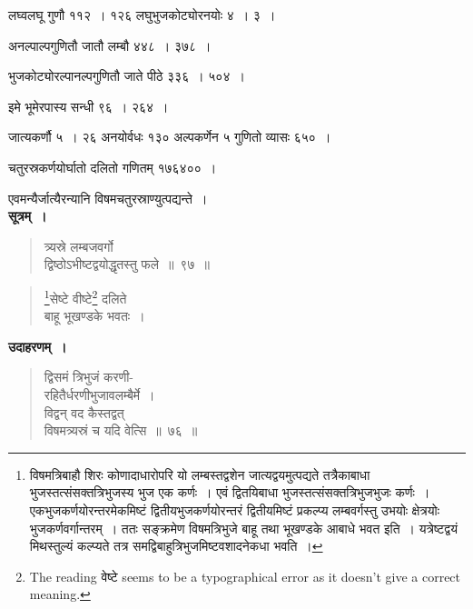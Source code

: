 \documentclass[11pt, openany]{book}
\begin{document}
लघ्वलघू गुणौ ११२~। १२६ लघुभुजकोट्योरनयोः ४~। ३~। \\
\vspace{-4mm}

अनल्पाल्पगुणितौ जातौ लम्बौ ४४८~। ३७८~। \\
\vspace{-4mm}

भुजकोट्योरल्पानल्पगुणितौ जाते पीठे ३३६~। ५०४~। \\
\vspace{-4mm}

इमे भूमेरपास्य सन्धी ९६~। २६४~। \\
\vspace{-4mm}

जात्यकर्णौ ५~। २६ अनयोर्वधः १३० अल्पकर्णेन ५ गुणितो व्यासः ६५०~। \\
\vspace{-4mm}

चतुरस्रकर्णयोर्घातो दलितो गणितम् १७६४००~। \\
\vspace{-4mm}

एवमन्यैर्जात्यैरन्यानि विषमचतुरस्राण्युत्पद्यन्ते~। \\

 \textbf{सूत्रम्~।} 
\begin{quote}
    \bs 
त्र्यस्रे लम्बजवर्गो \\
द्विष्ठोऽभीष्टद्वयोद्धृतस्तु फले~॥~९७~॥
\end{quote}

\newpage%
\setcounter{footnote}{0}

\begin{quote}
    \bs 
 \footnote{विषमत्रिबाहौ शिरः कोणादाधारोपरि यो लम्बस्तद्वशेन
जात्यद्वयमुत्पद्यते तत्रैकाबाधा भुजस्तत्संसक्तत्रिभुजस्य भुज एक
कर्णः~। एवं द्वितयिबाधा भुजस्तत्संसक्तत्रिभुजभुजः कर्णः~। एकभुजकर्णयोरन्तरमेकमिष्टं द्वितीयभुजकर्णयोरन्तरं द्वितीयमिष्टं प्रकल्प्य लम्बवर्गस्तु उभयोः क्षेत्रयोः भुजकर्णवर्गान्तरम्~। ततः सङ्क्रमेण विषमत्रिभुजे बाहू तथा भूखण्डके आबाधे भवत
इति~। यत्रेष्टद्वयं मिथस्तुल्यं कल्प्यते तत्र समद्विबाहुत्रिभुजमिष्टवशादनेकधा भवति~।}सेष्टे वीष्टे\footnote{The reading वेष्टे seems to be a typographical error as it doesn't give a correct meaning.} दलिते \\
बाहू भूखण्डके भवतः~।
\end{quote}

 \textbf{उदाहरणम्~।} 
\begin{quote}
    \bqt 
द्विसमं त्रिभुजं करणी-\\
रहितैर्धरणीभुजावलम्बैर्मे~।\\
विद्वन् वद कैस्तद्वत् \\
विषमत्र्यस्रं च यदि वेत्सि~॥~७६~॥
\end{quote}
\end{document}
